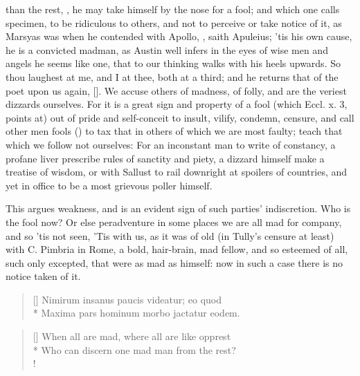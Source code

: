 {than the rest, , he may take
himself by the nose for a fool; and which one calls 
specimen, to be ridiculous to others, and not to perceive or take
notice of it, as Marsyas was when he contended with Apollo, , saith Apuleius; 'tis his own
cause, he is a convicted madman, as Austin well infers in the eyes
of wise men and angels he seems like one, that to our thinking walks
with his heels upwards. So thou laughest at me, and I at thee, both at
a third; and he returns that of the poet upon us again, [\baselineskip]. We accuse others of
madness, of folly, and are the veriest dizzards ourselves. For it is a
great sign and property of a fool (which Eccl. x. 3, points at) out of
pride and self-conceit to insult, vilify, condemn, censure, and call
other men fools () to tax that in
others of which we are most faulty; teach that which we follow not
ourselves: For an inconstant man to write of constancy, a profane liver
prescribe rules of sanctity and piety, a dizzard himself make a
treatise of wisdom, or with Sallust to rail downright at spoilers of
countries, and yet in office to be a most grievous poller himself.

This argues weakness, and is an evident sign of such parties'
indiscretion.  Who is the fool
now? Or else peradventure in some places we are all mad for company,
and so 'tis not seen,  'Tis with us, as it was of old (in
Tully's censure at least) with C. Pimbria in Rome, a bold,
hair-brain, mad fellow, and so esteemed of all, such only excepted,
that were as mad as himself: now in such a case there is no notice
taken of it.

\settowidth{\versewidth}{Maxima pars hominum morbo jactatur eodem.}
\begin{verse}[\versewidth]
\textlatin{Nimirum insanus paucis videatur; eo quod}\\*
\textlatin{Maxima pars hominum morbo jactatur eodem.}
\end{verse}

\settowidth{\versewidth}{When all are mad, where all are like opprest}
\begin{verse}[\versewidth]
When all are mad, where all are like opprest\\*
Who can discern one mad man from the rest?\\!
\end{verse}

}
